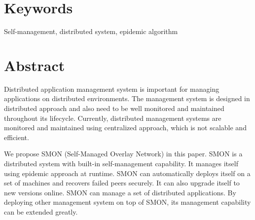 \section*{Keywords}
Self-management, distributed system, epidemic algorithm

\section*{Abstract}

Distributed application management system is important for
managing applications on distributed environments. The
management system is designed in distributed approach and
also need to be well monitored and maintained throughout its
lifecycle. Currently, distributed management systems are
monitored and maintained using centralized approach, which
is not scalable and efficient.

We propose SMON (Self-Managed Overlay Network) in this
paper. SMON is a distributed system with built-in
self-management capability. It manages itself using epidemic
approach at runtime. SMON can automatically deploys itself
on a set of machines and recovers failed peers securely. It
can also upgrade itself to new versions online. SMON can
manage a set of distributed applications. By deploying other
management system on top of SMON, its management capability
can be extended greatly.

